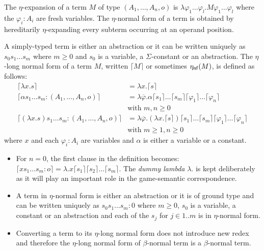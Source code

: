 \documentclass{llncs}
\newcommand\aux[1]{\lceil #1\rceil}
\newcommand\etanf[1]{\eta_{\sf nf}(#1)}
\begin{document}
The $\eta$-expansion of a term $M$ of type $(A_1,\ldots,A_n,o)$ is
$\lambda \varphi_1 \ldots \varphi_l . M \varphi_1 \ldots \varphi_l$
where the $\varphi_i:A_i$ are fresh variables. The $\eta$-normal
form of a term is obtained by hereditarily $\eta$-expanding every
subterm occurring at an operand position.

\begin{definition}
A simply-typed term is either an abstraction or it can be written uniquely as
$s_0 s_1 \ldots s_m$ where $m\geq0$ and $s_0$ is a variable, a $\Sigma$-constant or an abstraction.
The $\eta$-long normal form of a term $M$, written $\aux{M}$ or sometimes $\etanf{M}$,
is defined as follows:
\begin{align*}
\aux{\lambda x . s } &= \lambda x . \aux{s} \\
\aux{\alpha s_1 \ldots s_m : (A_1,\ldots,A_n,o)} &= \lambda \overline{\varphi} . \alpha \aux{s_1}\ldots \aux{s_m} \aux{\varphi_1} \ldots \aux{\varphi_n} \\
& \mbox{with $m,n\geq0$}\\
\aux{(\lambda x . s) s_1 \ldots s_m : (A_1,\ldots,A_n,o) } &= \lambda \overline{\varphi} . (\lambda x . \aux{s}) \aux{s_1} \ldots \aux{s_m} \aux{\varphi_1} \ldots \aux{\varphi_n} \\
& \mbox{with $m\geq 1,n\geq0$}
\end{align*}
where $x$ and each $\varphi_i : A_i$ are variables and $\alpha$ is
either a variable or a constant.
\end{definition}

\begin{remark}
\begin{itemize}
\item For $n=0$, the first clause in the definition becomes:
$\aux{x s_1 \ldots s_m : o} = \lambda . x \aux{s_1} \aux{s_2} \ldots \aux{s_m}.$
The \textsl{dummy lambda} $\lambda .$ is kept deliberately as it will play an important role in the
game-semantic correspondence.

\item A term in $\eta$-normal form is either an abstraction or it is of ground type and can be written uniquely as
$s_0 s_1 \ldots s_m : 0$ where $m\geq0$,  $s_0$ is a variable, a constant or an abstraction and each of the $s_j$ for $j\in 1..m$ is in $\eta$-normal form.

\item Converting a term to its $\eta$-long normal form does not introduce new redex and therefore
the $\eta$-long normal form of $\beta$-normal term is a $\beta$-normal term.
\end{itemize}
\end{remark}
\end{document}
